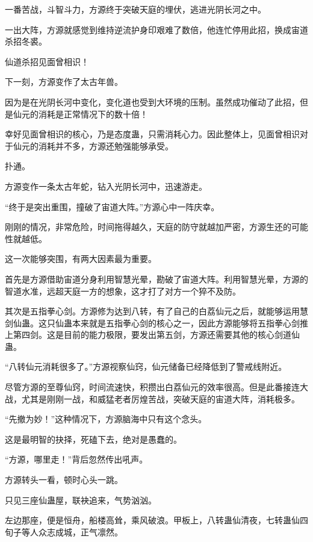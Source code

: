 
\begin{this_body}



一番苦战，斗智斗力，方源终于突破天庭的埋伏，逃进光阴长河之中。

一出大阵，方源就感觉到维持逆流护身印艰难了数倍，他连忙停用此招，换成宙道杀招冬裘。

仙道杀招见面曾相识！

下一刻，方源变作了太古年兽。

因为是在光阴长河中变化，变化道也受到大环境的压制。虽然成功催动了此招，但是仙元的消耗是正常情况下的数十倍！

幸好见面曾相识的核心，乃是态度蛊，只需消耗心力。因此整体上，见面曾相识对于仙元的消耗并不多，方源还勉强能够承受。

扑通。

方源变作一条太古年蛇，钻入光阴长河中，迅速游走。

“终于是突出重围，撞破了宙道大阵。”方源心中一阵庆幸。

刚刚的情况，非常危险，时间拖得越久，天庭的防守就越加严密，方源生还的可能性就越低。

这一次能够突围，有两大因素最为重要。

首先是方源借助宙道分身利用智慧光晕，勘破了宙道大阵。利用智慧光晕，方源的智道水准，远超天庭一方的想象，这才打了对方一个猝不及防。

其次是五指拳心剑。方源修为达到八转，有了自己的白荔仙元之后，就能够运用慧剑仙蛊。这只仙蛊本来就是五指拳心剑的核心之一，因此方源能够将五指拳心剑推上第四剑。这是目前的能力极限，要发出第五剑，方源还需要其他的核心剑道仙蛊。

“八转仙元消耗很多了。”方源视察仙窍，仙元储备已经降低到了警戒线附近。

尽管方源的至尊仙窍，时间流速快，积攒出白荔仙元的效率很高。但是此番接连大战，尤其是刚刚一战，和威猛老者厉煌苦战，突破天庭的宙道大阵，消耗极多。

“先撤为妙！”这种情况下，方源脑海中只有这个念头。

这是最明智的抉择，死磕下去，绝对是愚蠢的。

“方源，哪里走！”背后忽然传出吼声。

方源转头一看，顿时心头一跳。

只见三座仙蛊屋，联袂追来，气势汹汹。

左边那座，便是恒舟，船楼高耸，乘风破浪。甲板上，八转蛊仙清夜，七转蛊仙四旬子等人众志成城，正气凛然。


\end{this_body}
